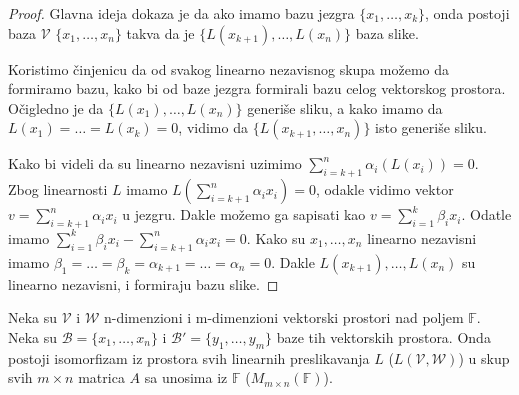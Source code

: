 \documentclass{article}
\begin{document}
\begin{proof}
  Glavna ideja dokaza je da ako imamo bazu jezgra $\{x_1, \ldots, x_k\}$, onda postoji baza $\mathcal{V}$ $\{x_1, \ldots, x_n\}$ takva da je $\{L(x_{k + 1}), \ldots, L(x_n)\}$ baza slike.

  Koristimo činjenicu da od svakog linearno nezavisnog skupa možemo da formiramo bazu, kako bi od baze jezgra formirali bazu celog vektorskog prostora.
  Očigledno je da $\{L(x_1), \ldots, L(x_n)\}$ generiše sliku, a kako imamo da $L(x_1) = \ldots = L(x_k) = 0$, vidimo da $\{L(x_{k + 1}, \ldots, x_n)\}$ isto generiše sliku.

  Kako bi videli da su linearno nezavisni uzimimo $\sum_{i = k + 1}^{n} \alpha_i (L(x_i)) = 0$.
  Zbog linearnosti $L$ imamo $L(\sum_{i = k + 1}^{n} \alpha_i x_i) = 0$, odakle vidimo vektor $v = \sum_{i = k + 1}^{n} \alpha_i x_i$ u jezgru.
  Dakle možemo ga sapisati kao $v = \sum_{i = 1}^{k} \beta_i x_i$.
  Odatle imamo $\sum_{i = 1}^{k} \beta_i x_i - \sum_{i = k + 1}^{n} \alpha_i x_i = 0$.
  Kako su $x_1, \ldots, x_n$ linearno nezavisni imamo $\beta_1 = \ldots = \beta_k = \alpha_{k + 1} = \ldots = \alpha_n = 0$.
  Dakle $L(x_{k + 1}), \ldots, L(x_n)$ su linearno nezavisni, i formiraju bazu slike.
\end{proof}

\begin{theorem}
  Neka su $\mathcal{V}$ i $\mathcal{W}$ n-dimenzioni i m-dimenzioni vektorski prostori nad poljem $\mathbb{F}$.
  Neka su $\mathcal{B} = \{x_1, \ldots, x_n\}$ i $\mathcal{B}' = \{y_1, \ldots, y_m\}$ baze tih vektorskih prostora.
  Onda postoji isomorfizam iz prostora svih linearnih preslikavanja $L$ ($L(\mathcal{V}, \mathcal{W})$) u skup svih $m \times n$ matrica $A$ sa unosima iz $\mathbb{F}$ ($M_{m \times n}(\mathbb{F})$).
\end{theorem}
\end{document}
